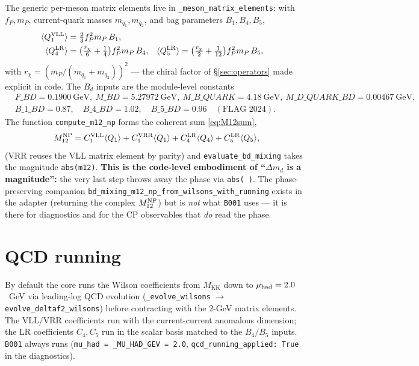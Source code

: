 \documentclass[11pt]{article}
\newcommand{\MKK}{M_{\mathrm{KK}}}
\newcommand{\Mtwelve}{M_{12}}
\newcommand{\dmd}{\Delta m_d}
\newcommand{\code}[1]{\texttt{#1}}
\theoremstyle{definition}
\begin{document}
The generic per-meson matrix elements live in \code{\_meson\_matrix\_elements}:
with $f_P, m_P$, current-quark masses $m_{q_1},m_{q_2}$, and bag parameters
$B_1,B_4,B_5$,
\begin{align}
\langle Q_1^{\rm VLL}\rangle &= \tfrac23 f_P^2 m_P\, B_1, \\
\langle Q_4^{\rm LR}\rangle &= \big(\tfrac{r_\chi}{6}+\tfrac14\big) f_P^2 m_P\, B_4, &
\langle Q_5^{\rm LR}\rangle &= \big(\tfrac{r_\chi}{2}+\tfrac1{12}\big) f_P^2 m_P\, B_5,
\end{align}
with $r_\chi=(m_P/(m_{q_1}+m_{q_2}))^2$ --- the chiral factor of
\S\ref{sec:operators} made explicit in code. The $B_d$ inputs are the
module-level constants
\begin{equation}
\begin{aligned}
&F\_BD=0.1900~\text{GeV},\ M\_BD=5.27972~\text{GeV},\
M\_B\_QUARK=4.18~\text{GeV},\ M\_D\_QUARK\_BD=0.00467~\text{GeV},\\
&B\_1\_BD=0.87,\quad B\_4\_BD=1.02,\quad B\_5\_BD=0.96
\quad(\text{FLAG 2024}).
\end{aligned}
\end{equation}
The function \code{compute\_m12\_np} forms the coherent sum
\eqref{eq:M12sum},
\begin{equation}
\Mtwelve^{\rm NP}
   = C_1^{\rm VLL}\langle Q_1\rangle + C_1^{\rm VRR}\langle Q_1\rangle
   + C_4^{\rm LR}\langle Q_4\rangle + C_5^{\rm LR}\langle Q_5\rangle,
\label{eq:codeM12}
\end{equation}
(VRR reuses the VLL matrix element by parity) and \code{evaluate\_bd\_mixing}
takes the magnitude \code{abs(m12)}. \textbf{This is the code-level embodiment of
``$\dmd$ is a magnitude'':} the very last step throws away the phase via
\code{abs(\,)}. The phase-preserving companion
\code{bd\_mixing\_m12\_np\_from\_wilsons\_with\_running} exists in the adapter
(returning the complex $\Mtwelve^{\rm NP}$) but is \emph{not} what \code{B001}
uses --- it is there for diagnostics and for the CP observables that \emph{do}
read the phase.

\section{QCD running}
\label{sec:coderunning}

By default the core runs the Wilson coefficients from $\MKK$ down to
$\mu_{\rm had}=2.0$~GeV via leading-log QCD evolution
(\code{\_evolve\_wilsons} $\to$ \code{evolve\_deltaf2\_wilsons}) before
contracting with the $2$-GeV matrix elements. The VLL/VRR coefficients run with
the current-current anomalous dimension; the LR coefficients $C_4,C_5$ run in the
scalar basis matched to the $B_4/B_5$ inputs. \code{B001} always runs
(\code{mu\_had = \_MU\_HAD\_GEV = 2.0}, \code{qcd\_running\_applied: True} in the
diagnostics).
\end{document}
